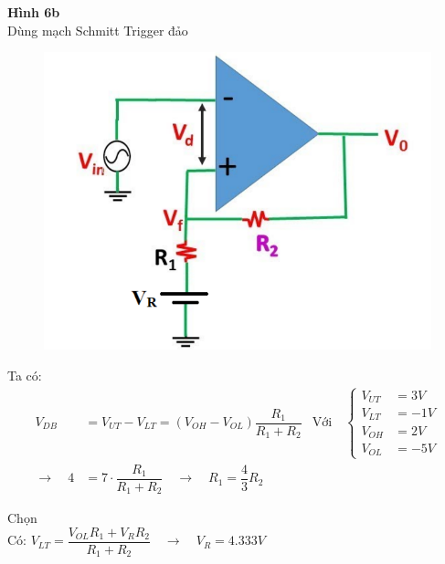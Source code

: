 \textbf{Hình 6b}\\
Dùng mạch Schmitt Trigger đảo
\begin{figure}[H]
	\centering
	\includegraphics[scale=0.5]{image/C11_Trigger_Dao.png}
\end{figure}
Ta có:
\begin{align*}
	V_{DB} &= V_{UT} - V_{LT} = (V_{OH}-V_{OL})\dfrac{R_1}{R_1+R_2}
	&\hspace{0cm}\text{Với}\quad
	\left\{
	\begin{aligned}
		V_{UT} &= 3V\\
		V_{LT} &= -1V\\
		V_{OH} &= 2V\\
		V_{OL} &= -5V
	\end{aligned}
	\right.\\
	\rightarrow\quad   4 &= 7 \cdot \dfrac{R_1}{R_1+R_2} \quad
    \rightarrow\quad R_1 = \dfrac{4}{3}R_2  
\end{align*}

Chọn
\\

Có: $V_{LT} = \dfrac{V_{OL}R_1 + V_RR_2}{R_1+R_2} \quad \rightarrow \quad \boxed{V_R = 4.333V}$\\

